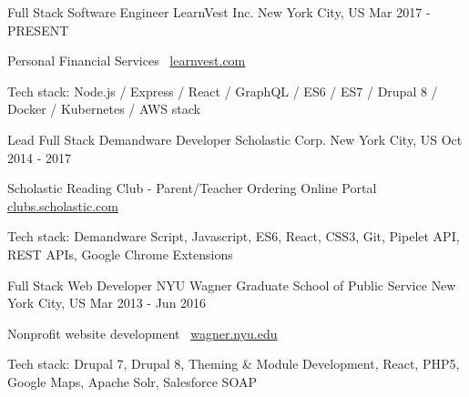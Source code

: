 

\begin{cventries}

  \cventry
    {Full Stack Software Engineer} %
    {LearnVest Inc.} %
    {New York City, US} %
    {Mar 2017 - PRESENT} %
    {
      \begin{cvitems} %
        \item {Personal Financial Services \guillemotright\,  \color{awesome} \href{https://www.learnvest.com}{learnvest.com}}
        \item {Tech stack: Node.js / Express / React / GraphQL / ES6 / ES7 / Drupal 8 / Docker / Kubernetes / AWS stack}
      \end{cvitems}
    }

  \cventry
    {Lead Full Stack Demandware Developer} %
    {Scholastic Corp.} %
    {New York City, US} %
    {Oct 2014 - 2017} %
    {
      \begin{cvitems} %
        \item {Scholastic Reading Club - Parent/Teacher Ordering Online Portal \guillemotright\,  \color{awesome} \href{https://clubs.scholastic.com}{clubs.scholastic.com}}
        \item {Tech stack: Demandware Script, Javascript, ES6, React, CSS3, Git, Pipelet API, REST APIs, Google Chrome Extensions}
      \end{cvitems}
    }

  \cventry
    {Full Stack Web Developer} %
    {NYU Wagner Graduate School of Public Service} %
    {New York City, US} %
    {Mar 2013 - Jun 2016} %
    {
      \begin{cvitems} %
        \item {Nonprofit website development \guillemotright\, \color{awesome} \href{https://wagner.nyu.edu}{wagner.nyu.edu}}
        \item {Tech stack: Drupal 7, Drupal 8, Theming \& Module Development, React, PHP5, Google Maps, Apache Solr, Salesforce SOAP}
      \end{cvitems}
    }


\end{cventries}
